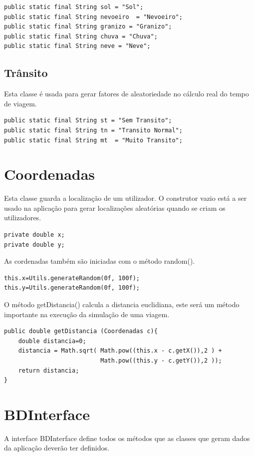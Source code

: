 \begin{verbatim}
public static final String sol = "Sol"; 
public static final String nevoeiro  = "Nevoeiro"; 
public static final String granizo = "Granizo";
public static final String chuva = "Chuva";
public static final String neve = "Neve"; 
\end{verbatim}

\subsection{Trânsito}

Esta classe é usada para gerar fatores de aleatoriedade no cálculo real do tempo de viagem.

\begin{verbatim}
public static final String st = "Sem Transito"; 
public static final String tn = "Transito Normal"; 
public static final String mt  = "Muito Transito"; 
\end{verbatim}

\section{Coordenadas}

Esta classe guarda a localização de um utilizador. O construtor vazio está a ser usado na aplicação para gerar localizações aleatórias quando se criam os utilizadores. 

\begin{verbatim}
private double x;
private double y;
\end{verbatim}

As cordenadas também são iniciadas com o método random(). 
\begin{verbatim}
this.x=Utils.generateRandom(0f, 100f);
this.y=Utils.generateRandom(0f, 100f);
\end{verbatim}

O método getDistancia() calcula a distancia euclidiana, este será um método importante na execução da simulação de uma viagem. 
\begin{verbatim}
public double getDistancia (Coordenadas c){
    double distancia=0; 
    distancia = Math.sqrt( Math.pow((this.x - c.getX()),2 ) +
                           Math.pow((this.y - c.getY()),2 ));
    return distancia; 
}
\end{verbatim}

\section{BDInterface}
A interface BDInterface define todos os métodos que as classes que geram dados da aplicação deverão ter definidos. 

